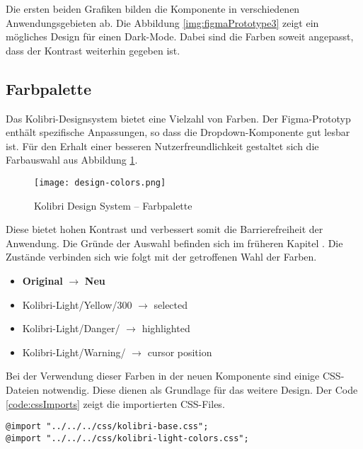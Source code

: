 Die ersten beiden Grafiken bilden die Komponente in verschiedenen Anwendungsgebieten ab. 
Die Abbildung \ref{img:figmaPrototype3} zeigt ein mögliches Design für einen Dark-Mode. 
Dabei sind die Farben soweit angepasst, dass der Kontrast weiterhin gegeben ist. 


\subsection{Farbpalette}
\label{sec:colorContrast}

Das Kolibri-Designsystem bietet eine Vielzahl von Farben. 
Der Figma-Prototyp enthält spezifische Anpassungen, so dass die Dropdown-Komponente gut lesbar ist. 
Für den Erhalt einer besseren Nutzerfreundlichkeit gestaltet sich die Farbauswahl aus Abbildung \ref{img:designColors}. 

\begin{figure}[!htb]
    \centering
    \texttt{[image: design-colors.png]}
    \caption{\centering Kolibri Design System – Farbpalette}
    \label{img:designColors}
\end{figure}

Diese bietet hohen Kontrast und verbessert somit die Barrierefreiheit der Anwendung. 
Die Gründe der Auswahl befinden sich im früheren Kapitel \textbf{}. 
Die Zustände verbinden sich wie folgt mit der getroffenen Wahl der Farben. 

\begin{itemize}
    \item \textbf{Original} $\rightarrow$ \textbf{Neu}
    \item Kolibri-Light/Yellow/300 $\rightarrow$ selected
    \item Kolibri-Light/Danger/ $\rightarrow$ highlighted
    \item Kolibri-Light/Warning/ $\rightarrow$ cursor position
\end{itemize}

Bei der Verwendung dieser Farben in der neuen Komponente sind einige CSS-Dateien notwendig. 
Diese dienen als Grundlage für das weitere Design. 
Der Code \ref{code:cssImports} zeigt die importierten CSS-Files. 

\begin{lstlisting}[style = htmlcssjs, caption = Notwendige CSS Imports, label = code:cssImports]
@import "../../../css/kolibri-base.css";
@import "../../../css/kolibri-light-colors.css";
\end{lstlisting}

